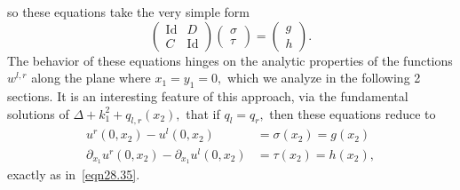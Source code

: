 \documentclass[11pt]{article}
\newcommand\pa{\partial}
\newcommand\Id{\operatorname{Id}}
\theoremstyle{definition}
\theoremstyle{remark}
\begin{document}
so these equations take the very simple form
\begin{equation}
  \left(
  \begin{matrix}
    \Id & D\\C&\Id
  \end{matrix}\right) \left(
  \begin{matrix}
    \sigma\\\tau
  \end{matrix}\right)=  \left(\begin{matrix}
    g\\ h
  \end{matrix}\right).
\end{equation}
The behavior of these equations hinges on the analytic properties of the functions
$w^{l,r}$ along the plane where $x_1=y_1=0,$ which we analyze in the following 2
sections.  It is an interesting feature of this approach, via the fundamental
solutions of $\Delta+k_1^2+q_{l,r}(x_2),$ that if $q_l=q_r,$ then these
equations reduce to
\begin{equation}
   \begin{split}
    u^r(0,x_2)-u^l(0,x_2)&=\sigma(x_2)=g(x_2)\\
    \pa_{x_1}u^r(0,x_2)-\pa_{x_1}u^l(0,x_2)&=\tau(x_2)=h(x_2),
  \end{split}
\end{equation}
exactly as in~\eqref{eqn28.35}.


 
\end{document}
